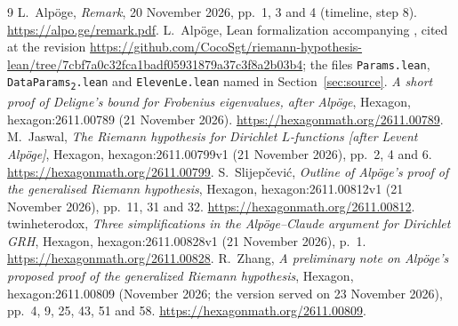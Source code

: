 \documentclass[11pt]{amsart}
\theoremstyle{definition}
\theoremstyle{remark}
\newcommand{\src}[1]{\texttt{#1}}
\begin{document}
\begin{thebibliography}{9}
 L.~Alp\"oge, \emph{Remark}, 20 November 2026, pp.~1, 3 and 4 (timeline, step 8). \url{https://alpo.ge/remark.pdf}.
 L.~Alp\"oge, Lean formalization accompanying \cite{remark}, cited at the revision \url{https://github.com/CocoSgt/riemann-hypothesis-lean/tree/7cbf7a0c32fca1badf05931879a37c3f8a2b03b4}; the files \src{Params.lean}, \src{DataParams\textsubscript{2}.lean} and \src{ElevenLe.lean} named in Section~\ref{sec:source}.
 \emph{A short proof of Deligne's bound for Frobenius eigenvalues, after Alp\"oge}, Hexagon, hexagon:2611.00789 (21 November 2026). \url{https://hexagonmath.org/2611.00789}.
 M.~Jaswal, \emph{The Riemann hypothesis for Dirichlet $L$-functions [after Levent Alp\"oge]}, Hexagon, hexagon:2611.00799v1 (21 November 2026), pp.~2, 4 and 6. \url{https://hexagonmath.org/2611.00799}.
 S.~Slijep\v{c}evi\'c, \emph{Outline of Alp\"oge's proof of the generalised Riemann hypothesis}, Hexagon, hexagon:2611.00812v1 (21 November 2026), pp.~11, 31 and 32. \url{https://hexagonmath.org/2611.00812}.
 twinheterodox, \emph{Three simplifications in the Alp\"oge--Claude argument for Dirichlet GRH}, Hexagon, hexagon:2611.00828v1 (21 November 2026), p.~1. \url{https://hexagonmath.org/2611.00828}.
 R.~Zhang, \emph{A preliminary note on Alp\"oge's proposed proof of the generalized Riemann hypothesis}, Hexagon, hexagon:2611.00809 (November 2026; the version served on 23 November 2026), pp.~4, 9, 25, 43, 51 and 58. \url{https://hexagonmath.org/2611.00809}.
\end{thebibliography}
\end{document}
